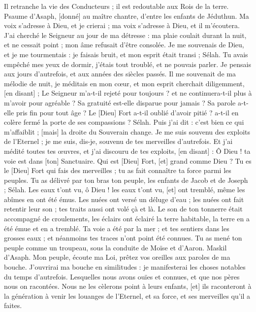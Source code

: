 \begin{multicols}{2}
Il retranche la vie des Conducteurs ; il est redoutable aux Rois de la terre.
\VerseOne{}Psaume d'Asaph, [donné] au maître chantre, d'entre les enfants de Jéduthun. Ma voix s'adresse à Dieu, et je crierai ; ma voix s'adresse à Dieu, et il m'écoutera.
J'ai cherché le Seigneur au jour de ma détresse : ma plaie coulait durant la nuit, et ne cessait point ; mon âme refusait d'être consolée.
Je me souvenais de Dieu, et je me tourmentais : je faisais bruit, et mon esprit était transi ; Sélah.
Tu avais empêché mes yeux de dormir, j'étais tout troublé, et ne pouvais parler.
Je pensais aux jours d'autrefois, et aux années des siècles passés.
Il me souvenait de ma mélodie de nuit, je méditais en mon cœur, et mon esprit cherchait diligemment, [en disant] ;
Le Seigneur m'a-t-il rejeté pour toujours ? et ne continuera-t-il plus à m'avoir pour agréable ?
Sa gratuité est-elle disparue pour jamais ? Sa parole a-t-elle pris fin pour tout âge ?
Le [Dieu] Fort a-t-il oublié d'avoir pitié ? a-t-il en colère fermé la porte de ses compassions ? Sélah.
Puis j'ai dit : c'est bien ce qui m'affaiblit ; [mais] la droite du Souverain change.
Je me suis souvenu des exploits de l'Eternel ; je me suis, dis-je, souvenu de tes merveilles d'autrefois.
Et j'ai médité toutes tes œuvres, et j'ai discouru de tes exploits, [en disant] :
Ô Dieu ! ta voie est dans [ton] Sanctuaire. Qui est [Dieu] Fort, [et] grand comme Dieu ?
Tu es le [Dieu] Fort qui fais des merveilles ; tu as fait connaître ta force parmi les peuples.
Tu as délivré par ton bras ton peuple, les enfants de Jacob et de Joseph ; Sélah.
Les eaux t'ont vu, ô Dieu ! les eaux t'ont vu, [et] ont tremblé, même les abîmes en ont été émus.
Les nuées ont versé un déluge d'eau ; les nuées ont fait retentir leur son ; tes traits aussi ont volé çà et là.
Le son de ton tonnerre était accompagné de croulements, les éclairs ont éclairé la terre habitable, la terre en a été émue et en a tremblé.
Ta voie a été par la mer ; et tes sentiers dans les grosses eaux ; et néanmoins tes traces n'ont point été connues.
Tu as mené ton peuple comme un troupeau, sous la conduite de Moïse et d'Aaron.
\VerseOne{}Maskil d'Asaph. Mon peuple, écoute ma Loi, prêtez vos oreilles aux paroles de ma bouche.
J'ouvrirai ma bouche en similitudes : je manifesterai les choses notables du temps d'autrefois.
Lesquelles nous avons ouïes et connues, et que nos pères nous on racontées.
Nous ne les cèlerons point à leurs enfants, [et] ils raconteront à la génération à venir les louanges de l'Eternel, et sa force, et ses merveilles qu'il a faites.

\end{multicols}
